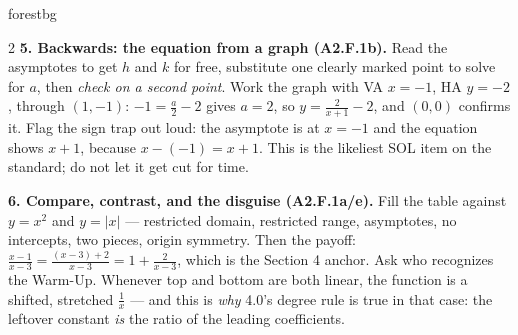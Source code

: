 \documentclass[10pt]{article}
\begin{document}
\begin{skillbox}[Lesson]{forestbg}
\begin{multicols}{2}
\textbf{5. Backwards: the equation from a graph (A2.F.1b).} Read the asymptotes to get $h$ and $k$ for
free, substitute one clearly marked point to solve for $a$, then \emph{check on a second point}. Work
the graph with VA $x=-1$, HA $y=-2$, through $(1,-1)$: $-1=\frac a2-2$ gives $a=2$, so
$y=\frac{2}{x+1}-2$, and $(0,0)$ confirms it. Flag the sign trap out loud: the asymptote is at $x=-1$
and the equation shows $x+1$, because $x-(-1)=x+1$. This is the likeliest SOL item on the standard; do
not let it get cut for time.

\textbf{6. Compare, contrast, and the disguise (A2.F.1a/e).} Fill the table against $y=x^2$ and
$y=|x|$ --- restricted domain, restricted range, asymptotes, no intercepts, two pieces, origin
symmetry. Then the payoff: $\frac{x-1}{x-3}=\frac{(x-3)+2}{x-3}=1+\frac{2}{x-3}$, which is the Section
4 anchor. Ask who recognizes the Warm-Up. Whenever top and bottom are both linear, the function is a
shifted, stretched $\frac1x$ --- and this is \emph{why} 4.0's degree rule is true in that case: the
leftover constant \emph{is} the ratio of the leading coefficients.
\end{multicols}
\end{skillbox}
\end{document}
